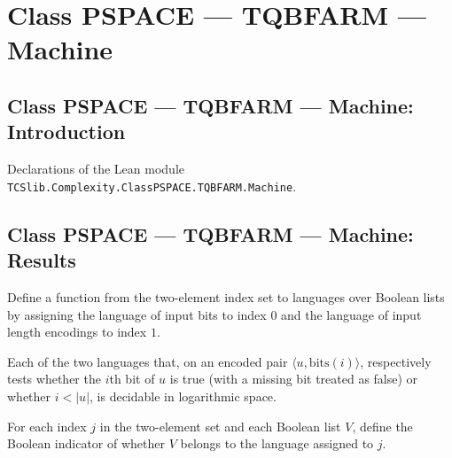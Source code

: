 \section{Class PSPACE --- TQBFARM --- Machine}
\subsection*{Class PSPACE --- TQBFARM --- Machine: Introduction}

Declarations of the Lean module \texttt{TCSlib.Complexity.ClassPSPACE.TQBFARM.Machine}.

\subsection*{Class PSPACE --- TQBFARM --- Machine: Results}

\begin{definition}
\label{Complexity.LogProg.TQBFARM.decs}
\leanok
{}
Define a function from the two-element index set to languages over Boolean lists by
assigning the language of input bits to index $0$ and the language of input length
encodings to index $1$.
\end{definition}

\begin{lemma}
\label{Complexity.LogProg.TQBFARM.decs_mem}
\leanok
{}
Each of the two languages that, on an encoded pair $\langle u,\mathrm{bits}(i)\rangle$,
respectively tests whether the $i$th bit of $u$ is true (with a missing bit treated as
false) or whether $i<|u|$, is decidable in logarithmic space.
\end{lemma}

\begin{definition}
\label{Complexity.LogProg.TQBFARM.orc}
\leanok
{}
For each index $j$ in the two-element set and each Boolean list $V$, define the Boolean
indicator of whether $V$ belongs to the language assigned to $j$.
\end{definition}

